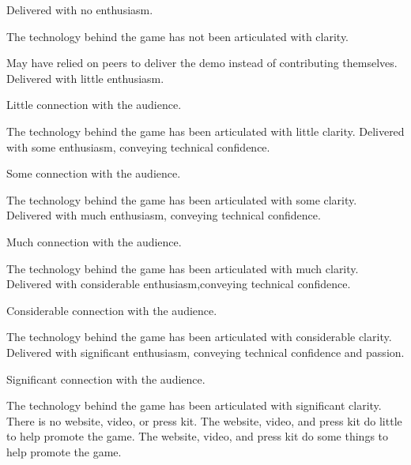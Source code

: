 \documentclass{../fal_assignment}
\begin{document}
\begin{markingrubric}
%
        \grade\fail Delivered with no enthusiasm. 
           \par The technology behind the game has not been articulated with clarity.
           \par May have relied on peers to deliver the demo instead of contributing themselves.
        \grade Delivered with little enthusiasm. 
            \par Little connection with the audience.
            \par The technology behind the game has been articulated with little clarity.
        \grade Delivered with some enthusiasm, conveying technical confidence. 
            \par Some connection with the audience.
            \par The technology behind the game has been articulated with some clarity.
        \grade Delivered with much enthusiasm, conveying technical confidence. 
            \par Much connection with the audience.
            \par The technology behind the game has been articulated with much clarity.
        \grade Delivered with considerable enthusiasm,conveying technical confidence. 
            \par Considerable connection with the audience.
            \par The technology behind the game has been articulated with considerable clarity.
        \grade Delivered with significant enthusiasm, conveying technical confidence and passion.
            \par Significant connection with the audience.
            \par The technology behind the game has been articulated with significant clarity.
%
        \grade\fail There is no website, video, or press kit. 
        \grade The website, video, and press kit do little to help promote the game.
        \grade The website, video, and press kit do some things to help promote the game.

\end{markingrubric}
\end{document}
